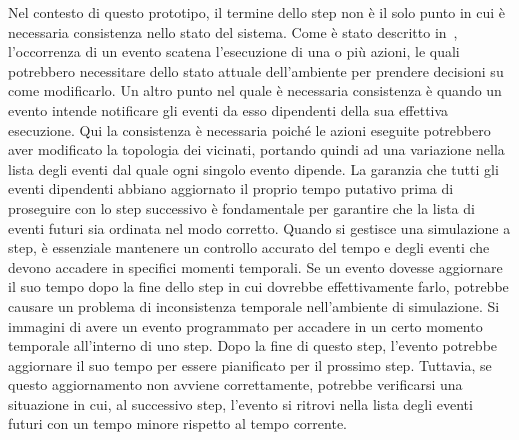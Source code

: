 \documentclass[12pt,a4paper,openright,twoside]{book}
\begin{document}
Nel contesto di questo prototipo, il termine dello step non è il solo punto in cui è necessaria consistenza nello stato del sistema. Come è stato descritto in~, l'occorrenza di un evento scatena l'esecuzione di una o più azioni, le quali potrebbero necessitare dello stato attuale dell'ambiente per prendere decisioni su come modificarlo. 
Un altro punto nel quale è necessaria consistenza è quando un evento intende notificare gli eventi da esso dipendenti della sua effettiva esecuzione. Qui la consistenza è necessaria poiché le azioni eseguite potrebbero aver modificato la topologia dei vicinati, portando quindi ad una variazione nella lista degli eventi dal quale ogni singolo evento dipende. 
La garanzia che tutti gli eventi dipendenti abbiano aggiornato il proprio tempo putativo prima di proseguire con lo step successivo è fondamentale per garantire che la lista di eventi futuri sia ordinata nel modo corretto. Quando si gestisce una simulazione a step, è essenziale mantenere un controllo accurato del tempo e degli eventi che devono accadere in specifici momenti temporali. Se un evento dovesse aggiornare il suo tempo dopo la fine dello step in cui dovrebbe effettivamente farlo, potrebbe causare un problema di inconsistenza temporale nell'ambiente di simulazione.
Si immagini di avere un evento programmato per accadere in un certo momento temporale all'interno di uno step. Dopo la fine di questo step, l'evento potrebbe aggiornare il suo tempo per essere pianificato per il prossimo step. Tuttavia, se questo aggiornamento non avviene correttamente, potrebbe verificarsi una situazione in cui, al successivo step, l'evento si ritrovi nella lista degli eventi futuri con un tempo minore rispetto al tempo corrente.
\end{document}
